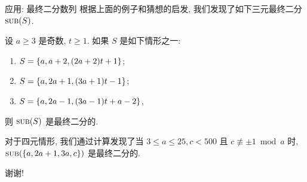 \documentclass[aspectratio=169]{ctexbeamer}
\DeclareMathOperator*{\SUB}{{\text{{\upshape\textsc{sub}}}}}
\begin{document}
\begin{frame}{应用: 最终二分数列}
	\onslide<+->
	根据上面的例子和猜想的启发, 我们发现了如下三元最终二分 $\SUB(S)$.
	\onslide<+->
	\begin{theorem}
		设 $a\ge 3$ 是奇数, $t\ge 1$.
		如果 $S$ 是如下情形之一:
		\begin{enumerate}
			\item $S={\left\{a,a+2,(2a+2)t+1\right\}}$;
			\item $S={\left\{a,2a+1,(3a+1)t-1\right\}}$;
			\item $S={\left\{a,2a-1,(3a-1)t+a-2\right\}}$,
		\end{enumerate}
		则 $\SUB(S)$ 是最终二分的.
	\end{theorem}
	\onslide<+->
	对于四元情形, 我们通过计算发现了当 $3\le a\le 25, c<500$ 且 $c\not\equiv \pm1 \bmod a$ 时, $\SUB(\set{a,2a+1,3a,c})$ 是最终二分的.
\end{frame}



\begin{frame}
\begin{center}
\huge 谢谢!
\end{center}
\end{frame}
\end{document}
